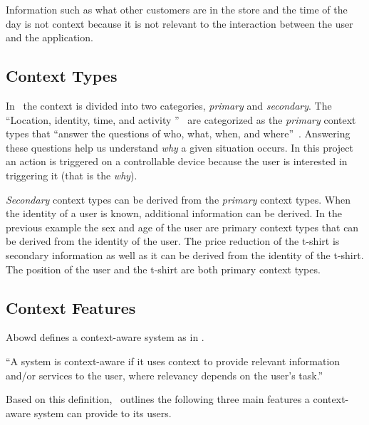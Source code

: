 Information such as what other customers are in the store and the time of the day is not context because it is not relevant to the interaction between the user and the application.

\subsection{Context Types}

In~\cite{abowd1999towards} the context is divided into two categories, \emph{primary} and \emph{secondary}. The ``Location, identity, time, and activity ''~\cite[p. 5]{abowd1999towards} are categorized as the \emph{primary} context types that ``answer  the questions of who, what, when, and where''~\cite[p. 5]{abowd1999towards}. Answering these questions help us understand \emph{why} a given situation occurs. In this project an action is triggered on a controllable device because the user is interested in triggering it (that is the \emph{why}).

\emph{Secondary} context types can be derived from the \emph{primary} context types. When the identity of a user is known, additional information can be derived. In the previous example the sex and age of the user are primary context types that can be derived from the identity of the user. 
The price reduction of the t-shirt is secondary information as well as it can be derived from the identity of the t-shirt.
The position of the user and the t-shirt are both primary context types.

\subsection{Context Features}

Abowd \etal\cite{abowd1999towards} defines a context-aware system as in .

\begin{definition}
\label{def:context-aware}
``A system is context-aware if it uses context to provide relevant information and/or services to the user, where relevancy depends on the user's task.''~\cite[p. 6]{abowd1999towards}
\end{definition}

Based on this definition,~\cite{ferreira2014distributed} outlines the following three main features a context-aware system can provide to its users.

